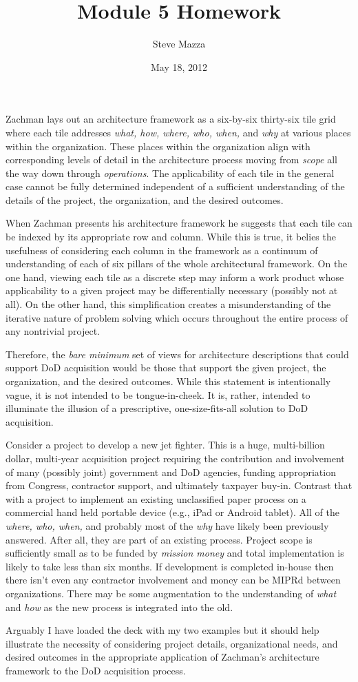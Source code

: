 \documentclass[letterpaper,12pt]{article}
\title{Module 5 Homework}
\author{Steve Mazza}
\date{May 18, 2012}
\begin{document}
\maketitle


Zachman lays out an architecture framework as a six-by-six thirty-six tile grid where each tile addresses \emph{what, how, where, who, when,} and \emph{why} at various places within the organization.  These places within the organization align with corresponding levels of detail in the architecture process moving from \emph{scope} all the way down through \emph{operations}.  The applicability of each tile in the general case cannot be fully determined independent of a sufficient understanding of the details of the project, the organization, and the desired outcomes.  

When Zachman presents his architecture framework he suggests that each tile can be indexed by its appropriate row and column.  While this is true, it belies the usefulness of considering each column in the framework as a continuum of understanding of each of six pillars of the whole architectural framework.  On the one hand, viewing each tile as a discrete step may inform a work product whose applicability to a given project may be differentially necessary (possibly not at all).  On the other hand, this simplification creates a misunderstanding of the iterative nature of problem solving which occurs throughout the entire process of any nontrivial project.

Therefore, the \emph{bare minimum} set of views for architecture descriptions that could support DoD acquisition would be those that support the given project, the organization, and the desired outcomes.  While this statement is intentionally vague, it is not intended to be tongue-in-cheek.  It is, rather, intended to illuminate the illusion of a prescriptive, one-size-fits-all solution to DoD acquisition.

Consider a project to develop a new jet fighter.  This is a huge, multi-billion dollar, multi-year acquisition project requiring the contribution and involvement of many (possibly joint) government and DoD agencies, funding appropriation from Congress, contractor support, and ultimately taxpayer buy-in.  Contrast that with a project to implement an existing unclassified paper process on a commercial hand held portable device (e.g., iPad or Android tablet).  All of the \emph{where, who, when,} and probably most of the \emph{why} have likely been previously answered. After all, they are part of an existing process. Project scope is sufficiently small as to be funded by \emph{mission money} and total implementation is likely to take less than six months.  If development is completed in-house then there isn't even any contractor involvement and money can be MIPRd between organizations.  There may be some augmentation to the understanding of \emph{what} and \emph{how} as the new process is integrated into the old.

Arguably I have loaded the deck with my two examples but it should help illustrate the necessity of considering project details, organizational needs, and desired outcomes in the appropriate application of Zachman's architecture framework to the DoD acquisition process.
\end{document}
